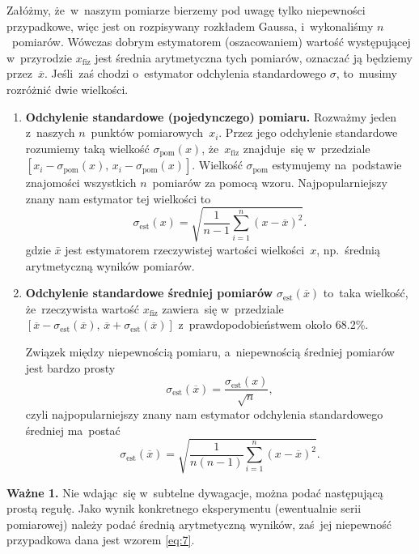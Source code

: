 \documentclass[a4paper,11pt]{article}
\newcommand{\tb}{\textbf}
\begin{document}
Załóżmy, że~w~naszym pomiarze bierzemy pod uwagę tylko niepewności
przypadkowe, więc jest on rozpisywany rozkładem Gaussa, i~wykonaliśmy
$n$~pomiarów. Wówczas dobrym estymatorem (oszacowaniem) wartość
występującej w~przyrodzie $x_{ \textrm{fiz} }$ jest średnia
arytmetyczna tych pomiarów, oznaczać ją będziemy przez~$\overline{x}$.
Jeśli~zaś chodzi o~estymator odchylenia standardowego $\sigma$,
to~musimy rozróżnić dwie wielkości.

\begin{enumerate}
\item \tb{Odchylenie standardowe (pojedynczego) pomiaru.} Rozważmy
  jeden z~naszych $n$~punktów pomiarowych~$x_{ i }$. Przez jego
  odchylenie standardowe rozumiemy taką wielkość
  $\sigma_{ \textrm{pom} }( x )$, że~$x_{ \textrm{fiz} }$ znajduje~się
  w~przedziale
  $[ x_{ i } - \sigma_{ \textrm{pom} }( x ),\, x_{ i } - \sigma_{
    \textrm{pom} }( x ) ]$. Wielkość $\sigma_{ \textrm{pom} }$
  estymujemy na~podstawie znajomości wszystkich $n$~pomiarów za pomocą
  wzoru. Najpopularniejszy znany nam estymator tej wielkości to
  \begin{equation}
    \label{eq:5}
    \sigma_{ \textrm{est} }( x )
    = \sqrt{ \frac{ 1 }{ n - 1 }
      \sum_{ i = 1 }^{ n } ( x - \overline{x} )^{ 2 } }.
  \end{equation}
  gdzie $\bar x$ jest estymatorem rzeczywistej wartości wielkości~$x$,
  np.~średnią arytmetyczną wyników pomiarów.
\item \tb{Odchylenie standardowe średniej pomiarów}
  $\sigma_{ \textrm{est} }( \overline{x} )$ to~taka wielkość,
  że~rzeczywista wartość $x_{ \textrm{fiz} }$ zawiera~się w~przedziale
  $[ \overline{x} - \sigma_{ \textrm{est} }( \overline{x} ),\,
  \overline{x} + \sigma_{ \textrm{est} }( \overline{x} ) ]$
  z~prawdopodobieństwem około 68.2\%.

  Związek między niepewnością pomiaru, a~niepewnością średniej
  pomiarów jest bardzo prosty
  \begin{equation}
    \label{eq:6}
    \sigma_{ \textrm{est} }( \overline{x} )
    = \frac{ \sigma_{ \textrm{est} }( x ) }{ \sqrt{ n } },
  \end{equation}
  czyli najpopularniejszy znany nam estymator odchylenia standardowego
  średniej ma~postać
  \begin{equation}
    \label{eq:7}
    \sigma_{ \textrm{est} }( \overline{x} ) = \sqrt{ \frac{ 1 }{ n ( n - 1 ) }
      \sum_{ i = 1 }^{ n } ( x - \overline{x} )^{ 2 } }.
  \end{equation}
\end{enumerate}
\tb{Ważne 1.} Nie wdając~się w~subtelne dywagacje, można podać
następującą prostą regułę. Jako wynik konkretnego eksperymentu
(ewentualnie serii pomiarowej) należy podać średnią arytmetyczną
wyników, zaś~jej niepewność przypadkowa dana jest wzorem \eqref{eq:7}.
\end{document}
